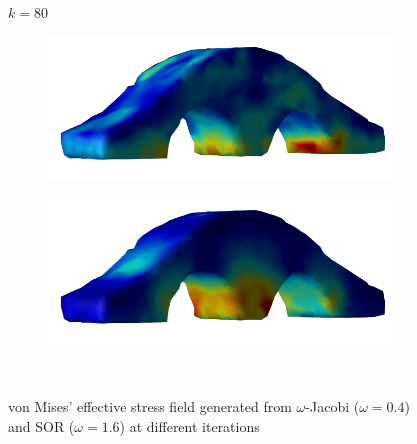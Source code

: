 \documentclass[11pt,titlepage]{article}
\begin{document}
\begin{figure}[!htbp]
\begin{center}
        $k=80$
        \quad
        \begin{subfigure}[b]{0.4\textwidth}
            \centering
            \includegraphics[width=\textwidth]{jacopt_vm/resized/archbridge_tiny_81}
        \end{subfigure}
        \begin{subfigure}[b]{0.4\textwidth}
            \centering
            \includegraphics[width=\textwidth]{soropt_vm/resized/archbridge_tiny_81}
        \end{subfigure}\\ 


        \caption{\label{fig:4} von Mises' effective stress field generated from $\omega$-Jacobi ($\omega=0.4$) and SOR ($\omega=1.6$) at different iterations}
    \end{center}
\end{figure} 


  


\newpage
\printbibliography
\end{document}
